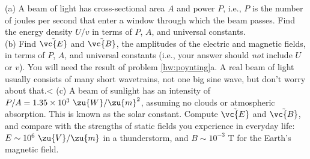         (a) A beam of light has cross-sectional area $A$ and power $P$, i.e., $P$ is
        the number of joules per second that enter a window through which the beam
        passes. Find the energy density $U/v$ in terms of $P$, $A$, and universal constants.\\
        (b) Find $\tilde{\vc{E}}$ and $\tilde{\vc{B}}$, the amplitudes of the
        electric and magnetic fields, in terms of $P$, $A$, and universal constants (i.e., your answer
        should \emph{not} include $U$ or $v$). You will need the result of problem
        \ref{hw:poynting}a.
        A real beam of light usually consists of
        many short wavetrains, not one big sine wave, but don't
        worry about that.\answercheck<%
        (c) A beam of sunlight has an intensity of $P/A=1.35\times10^3\ \zu{W}/\zu{m}^2$,
        assuming no clouds or atmospheric absorption. This is known as the
        solar constant. Compute  $\tilde{\vc{E}}$ and $\tilde{\vc{B}}$,
        and compare with the strengths of static fields you experience in everyday life:
        $E \sim 10^6\ \zu{V}/\zu{m}$ in a thunderstorm, and $B \sim 10^{-3}$ T for the Earth's
        magnetic field.\answercheck
